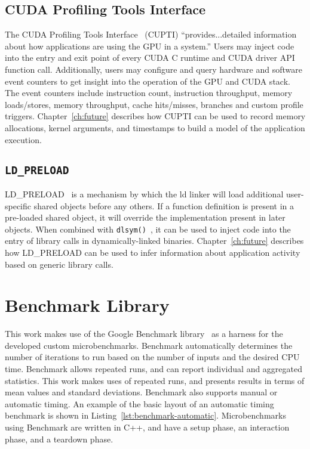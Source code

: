 \subsection{CUDA Profiling Tools Interface}
\label{sec:cupti}

The CUDA Profiling Tools Interface~\cite{nvidia2017cupti} (CUPTI) ``provides...detailed information about how applications are using the GPU in a system.''
Users may inject code into the entry and exit point of every CUDA C runtime and CUDA driver API function call.
Additionally, users may configure and query hardware and software event counters to get insight into the operation of the GPU and CUDA stack.
The event counters include instruction count, instruction throughput, memory loads/stores, memory throughput, cache hits/misses, branches and custom profile triggers.
Chapter~\ref{ch:future} describes how CUPTI can be used to record memory allocations, kernel arguments, and timestamps to build a model of the application execution.

\subsection{\texttt{LD\_PRELOAD}}
\label{sec:ldpreload}

LD\_PRELOAD~\cite{kerrisk2017ld} is a mechanism by which the ld linker will load additional user-specific shared objects before any others.
If a function definition is present in a pre-loaded shared object, it will override the implementation present in later objects.
When combined with \texttt{dlsym()}~\cite{kerrisk2017dlysm}, it can be used to inject code into the entry of library calls in dynamically-linked binaries.
Chapter~\ref{ch:future} describes how LD\_PRELOAD can be used to infer information about application activity based on generic library calls.


\section{Benchmark Library}
\label{sec:benchmark}

This work makes use of the Google Benchmark library~\cite{google2018benchmark} as a harness for the developed custom microbenchmarks.
Benchmark automatically determines the number of iterations to run based on the number of inputs and the desired CPU time.
Benchmark allows repeated runs, and can report individual and aggregated statistics.
This work makes uses of repeated runs, and presents results in terms of mean values and standard deviations.
Benchmark also supports manual or automatic timing.
An example of the basic layout of an automatic timing benchmark is shown in Listing~\ref{lst:benchmark-automatic}.
Microbenchmarks using Benchmark are written in C++, and have a setup phase, an interaction phase, and a teardown phase.

